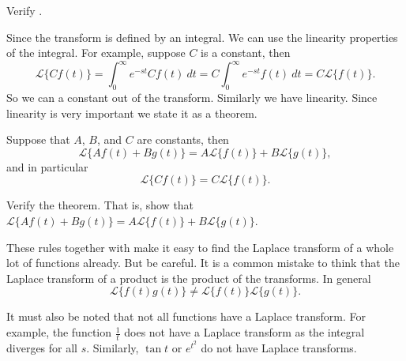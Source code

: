 \begin{exercise}
Verify .
\end{exercise}

Since the transform is defined by an integral.  We can use the linearity
properties of the integral.  For example, suppose $C$ is a constant, then
\begin{equation*}
\mathcal{L} \bigl\{ C f(t) \bigr\} =
\int_0^\infty e^{-st} C f(t) ~dt =
C \int_0^\infty e^{-st} f(t) ~dt =
C \mathcal{L} \bigl\{ f(t) \bigr\} .
\end{equation*}
So we can  a constant out of the transform.  Similarly  we have
linearity.
Since linearity is very important we state it as a theorem.

\begin{theorem}
Suppose that $A$, $B$, and $C$ are constants, then
\begin{equation*}
\boxed{~~
\mathcal{L} \bigl\{ A f(t) + B g(t) \bigr\} =
A \mathcal{L} \bigl\{ f(t) \bigr\} +
B \mathcal{L} \bigl\{ g(t) \bigr\} ,
~~}
\end{equation*}
and in particular
\begin{equation*}
\mathcal{L} \bigl\{ C f(t) \bigr\} =
C \mathcal{L} \bigl\{ f(t) \bigr\} .
\end{equation*}
\end{theorem}

\begin{exercise}
Verify the theorem.  That is, show that
$\mathcal{L} \bigl\{ A f(t) + B g(t) \bigr\} =
A \mathcal{L} \bigl\{ f(t) \bigr\} +
B \mathcal{L} \bigl\{ g(t) \bigr\}$.
\end{exercise}

These rules together with  make it easy to find
the Laplace transform of a whole lot of functions already.
But be careful.
It is a common mistake to think that the Laplace transform of a product
is the product of the transforms.  In general 
\begin{equation*}
\mathcal{L} \bigl\{ f(t) g(t) \bigr\} \not=
\mathcal{L} \bigl\{ f(t) \bigr\}
\mathcal{L} \bigl\{ g(t) \bigr\} .
\end{equation*}

It must also be noted that not all functions have a Laplace transform.  For
example, the function $\frac{1}{t}$ does not have a Laplace transform as the
integral diverges for all $s$.  Similarly,
$\tan t$ or $e^{t^2}$ do not have Laplace transforms.

